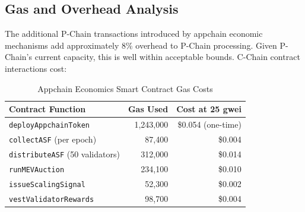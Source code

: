 \subsection{Gas and Overhead Analysis}

The additional P-Chain transactions introduced by appchain economic mechanisms add
approximately 8\% overhead to P-Chain processing. Given P-Chain's current capacity,
this is well within acceptable bounds. C-Chain contract interactions cost:

\begin{table}[H]
\centering
\caption{Appchain Economics Smart Contract Gas Costs}
\label{tab:econ_gas}
\begin{tabular}{lrr}
\toprule
\textbf{Contract Function} & \textbf{Gas Used} & \textbf{Cost at 25 gwei} \\
\midrule
\texttt{deployAppchainToken} & 1,243,000 & \$0.054 (one-time) \\
\texttt{collectASF} (per epoch) & 87,400 & \$0.004 \\
\texttt{distributeASF} (50 validators) & 312,000 & \$0.014 \\
\texttt{runMEVAuction} & 234,100 & \$0.010 \\
\texttt{issueScalingSignal} & 52,300 & \$0.002 \\
\texttt{vestValidatorRewards} & 98,700 & \$0.004 \\
\bottomrule
\end{tabular}
\end{table}


